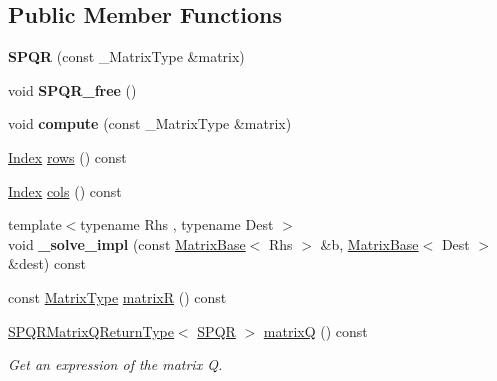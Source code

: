 \subsection*{Public Member Functions}
\begin{DoxyCompactItemize}
\item 
\mbox{\label{class_eigen_1_1_s_p_q_r_a444d838c0175e3879cf8236e59a3763e}} 
{\bfseries S\+P\+QR} (const \+\_\+\+Matrix\+Type \&matrix)
\item 
\mbox{\label{class_eigen_1_1_s_p_q_r_a79687f3c4632760f5bb3a847ebdf5b7a}} 
void {\bfseries S\+P\+Q\+R\+\_\+free} ()
\item 
\mbox{\label{class_eigen_1_1_s_p_q_r_a9fb013cddbd9e634b7174f8d2a4bca33}} 
void {\bfseries compute} (const \+\_\+\+Matrix\+Type \&matrix)
\item 
\hyperlink{namespace_eigen_a62e77e0933482dafde8fe197d9a2cfde}{Index} \hyperlink{class_eigen_1_1_s_p_q_r_a775e28a44fd466638114edbcd17ea50a}{rows} () const
\item 
\hyperlink{namespace_eigen_a62e77e0933482dafde8fe197d9a2cfde}{Index} \hyperlink{class_eigen_1_1_s_p_q_r_aa006d40963b05c7525b5ca0b02364d84}{cols} () const
\item 
\mbox{\label{class_eigen_1_1_s_p_q_r_ad95a552802fd81383bda4222b0e3924b}} 
{\footnotesize template$<$typename Rhs , typename Dest $>$ }\\void {\bfseries \+\_\+solve\+\_\+impl} (const \hyperlink{group___core___module_class_eigen_1_1_matrix_base}{Matrix\+Base}$<$ Rhs $>$ \&b, \hyperlink{group___core___module_class_eigen_1_1_matrix_base}{Matrix\+Base}$<$ Dest $>$ \&dest) const
\item 
const \hyperlink{group___sparse_core___module}{Matrix\+Type} \hyperlink{class_eigen_1_1_s_p_q_r_ad51661be35674dd6a65e27699dbb3fb9}{matrixR} () const
\item 
\mbox{\label{class_eigen_1_1_s_p_q_r_a93dbf1b487e28948e1ca2a33a35b6a54}} 
\hyperlink{struct_eigen_1_1_s_p_q_r_matrix_q_return_type}{S\+P\+Q\+R\+Matrix\+Q\+Return\+Type}$<$ \hyperlink{class_eigen_1_1_s_p_q_r}{S\+P\+QR} $>$ \hyperlink{class_eigen_1_1_s_p_q_r_a93dbf1b487e28948e1ca2a33a35b6a54}{matrixQ} () const
\begin{DoxyCompactList}\small\item\em Get an expression of the matrix Q. \end{DoxyCompactList}\item 

\end{DoxyCompactItemize}
